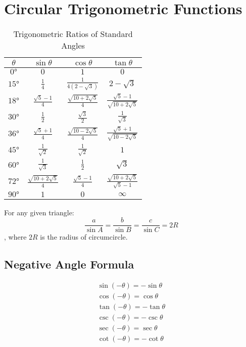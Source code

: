 \chapter{Circular Trigonometric Functions}
\begin{table}[htbp]
	\centering
	\begin{tabular}{c c c c}
		\toprule
		$\theta$&$\sin \theta$&$\cos \theta$&$\tan \theta$\\
		\midrule
		$\ang{0}$&$0$&$1$&$0$\\
		$\ang{15}$&$\frac{1}{4}$&$\frac{1}{4(2-\sqrt{3})}$&$2-\sqrt{3}$\\
		$\ang{18}$&$\frac{\sqrt{5}-1}{4}$&$\frac{\sqrt{10+2\sqrt{5}}}{4}$&$\frac{\sqrt{5}-1}{\sqrt{10+2\sqrt{5}}}$\\
		$\ang{30}$&$\frac{1}{2}$&$\frac{\sqrt{3}}{2}$&$\frac{1}{\sqrt{3}}$\\
		$\ang{36}$&$\frac{\sqrt{5}+1}{4}$&$\frac{\sqrt{10-2\sqrt{5}}}{4}$&$\frac{\sqrt{5}+1}{\sqrt{10-2\sqrt{5}}}$\\
		$\ang{45}$&$\frac{1}{\sqrt{2}}$&$\frac{1}{\sqrt{2}}$&$1$\\
		$\ang{60}$&$\frac{1}{\sqrt{3}}$&$\frac{1}{2}$&$\sqrt{3}$\\
		$\ang{72}$&$\frac{\sqrt{10+2\sqrt{5}}}{4}$&$\frac{\sqrt{5}-1}{4}$&$\frac{\sqrt{10+2\sqrt{5}}}{\sqrt{5}-1}$\\
		$\ang{90}$&$1$&$0$&$\infty$\\
		\hline
	\end{tabular}
	\caption{Trigonometric Ratios of Standard Angles}
	\label{table1}
\end{table}

For any given triangle:
\begin{equation}
	\dfrac{a}{\sin A}=\dfrac{b}{\sin B}=\dfrac{c}{\sin C}=2R
\end{equation}, where $2R$ is the radius of circumcircle.

\section{Negative Angle Formula}
\begin{align}
	\sin (-\theta)=-\sin \theta\\
	\cos (-\theta)=\cos \theta\\
	\tan (-\theta)=-\tan \theta\\
	\csc (-\theta)=-\csc \theta\\
	\sec (-\theta)=\sec \theta\\
	\cot (-\theta)=-\cot \theta
\end{align}



